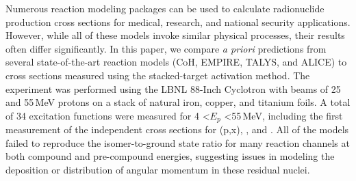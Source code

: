 



Numerous reaction modeling packages can be used to calculate radionuclide production cross sections for medical, research, and national security applications. 
However, while all of these models invoke similar physical processes, their results often differ significantly.  
In this paper, we compare \emph{a priori} predictions from several state-of-the-art reaction models (CoH, EMPIRE, TALYS, and ALICE) to cross sections measured using the stacked-target activation method.  
The experiment was performed using the LBNL 88-Inch Cyclotron with beams of 25 and 55\,MeV protons on a stack of natural iron, copper, and titanium foils.  
A total of 34 excitation functions were measured for 4 \textless $E_p$ \textless 55\,MeV, including the first measurement of the independent cross sections for (p,x), , and .  
All of the models failed to reproduce the isomer-to-ground state ratio for many  reaction channels at both compound and pre-compound energies, suggesting issues in modeling the deposition or distribution of angular momentum in these residual nuclei.  



